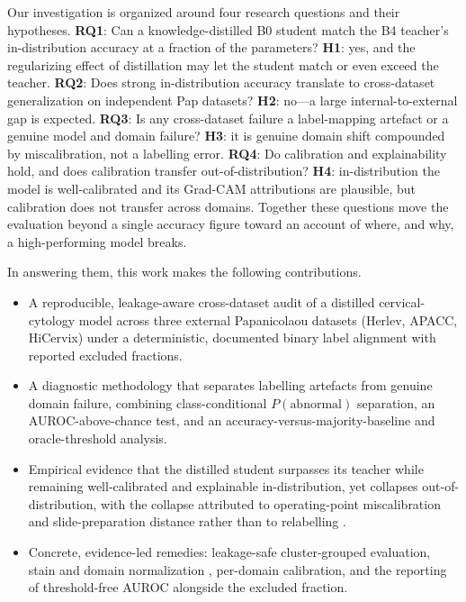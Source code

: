 \documentclass[twocolumn]{article}
\begin{document}
Our investigation is organized around four research questions and their hypotheses. \textbf{RQ1}: Can a knowledge-distilled B0 student match the B4 teacher's in-distribution accuracy at a fraction of the parameters? \textbf{H1}: yes, and the regularizing effect of distillation may let the student match or even exceed the teacher. \textbf{RQ2}: Does strong in-distribution accuracy translate to cross-dataset generalization on independent Pap datasets? \textbf{H2}: no---a large internal-to-external gap is expected. \textbf{RQ3}: Is any cross-dataset failure a label-mapping artefact or a genuine model and domain failure? \textbf{H3}: it is genuine domain shift compounded by miscalibration, not a labelling error. \textbf{RQ4}: Do calibration and explainability hold, and does calibration transfer out-of-distribution? \textbf{H4}: in-distribution the model is well-calibrated \citep{guo2017calibration} and its Grad-CAM attributions are plausible, but calibration does not transfer across domains. Together these questions move the evaluation beyond a single accuracy figure toward an account of where, and why, a high-performing model breaks.

In answering them, this work makes the following contributions.

\begin{itemize}
\item A reproducible, leakage-aware cross-dataset audit of a distilled cervical-cytology model across three external Papanicolaou datasets (Herlev, APACC, HiCervix) under a deterministic, documented binary label alignment with reported excluded fractions.
\item A diagnostic methodology that separates labelling artefacts from genuine domain failure, combining class-conditional $P(\text{abnormal})$ separation, an AUROC-above-chance test, and an accuracy-versus-majority-baseline and oracle-threshold analysis.
\item Empirical evidence that the distilled student surpasses its teacher while remaining well-calibrated and explainable in-distribution, yet collapses out-of-distribution, with the collapse attributed to operating-point miscalibration and slide-preparation distance rather than to relabelling \citep{geirhos2020shortcut}.
\item Concrete, evidence-led remedies: leakage-safe cluster-grouped evaluation, stain and domain normalization \citep{macenko2009stain}, per-domain calibration, and the reporting of threshold-free AUROC alongside the excluded fraction.
\end{itemize}
\end{document}
